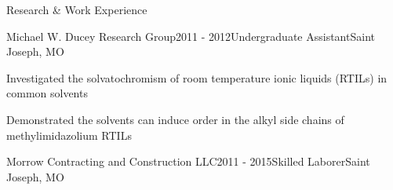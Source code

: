 \documentclass{resume} %
\begin{document}
\begin{rSection}{Research \& Work Experience}
\begin{rSubsection}{Michael W. Ducey Research Group}{2011 - 2012}{Undergraduate Assistant}{Saint Joseph, MO}
	\item Investigated the solvatochromism of room temperature ionic liquids (RTILs) in common solvents
	\item Demonstrated the solvents can induce order in the alkyl side chains of methylimidazolium RTILs
\end{rSubsection}

\begin{rSubsectionlistless}{Morrow Contracting and Construction LLC}{2011 - 2015}{Skilled Laborer}{Saint Joseph, MO}
\end{rSubsectionlistless}

\end{rSection}

\pagebreak
\end{document}
